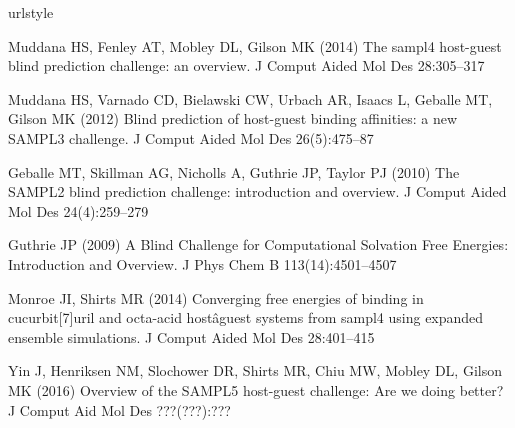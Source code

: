 
\begin{thebibliography}{25}
\providecommand{\natexlab}[1]{#1}
\providecommand{\url}[1]{{#1}}
\providecommand{\urlprefix}{URL }
\expandafter\ifx\csname urlstyle\endcsname\relax
  \providecommand{\doi}[1]{DOI~\discretionary{}{}{}#1}\else
  \providecommand{\doi}{DOI~\discretionary{}{}{}\begingroup
  \urlstyle{rm}\Url}\fi
\providecommand{\eprint}[2][]{\url{#2}}

Muddana HS, Fenley AT, Mobley DL, Gilson MK (2014) The sampl4 host-guest blind
  prediction challenge: an overview. J Comput Aided Mol Des 28:305--317

Muddana HS, Varnado CD, Bielawski CW, Urbach AR, Isaacs L, Geballe MT, Gilson
  MK (2012) {Blind prediction of host-guest binding affinities: a new SAMPL3
  challenge.} J Comput Aided Mol Des 26(5):475--87

Geballe MT, Skillman AG, Nicholls A, Guthrie JP, Taylor PJ (2010) The {SAMPL}2
  blind prediction challenge: introduction and overview. J Comput Aided Mol Des
  24(4):259--279

Guthrie JP (2009) A {Blind} {Challenge} for {Computational} {Solvation} {Free}
  {Energies}: {Introduction} and {Overview}. J Phys Chem B 113(14):4501--4507

Monroe JI, Shirts MR (2014) Converging free energies of binding in
  cucurbit[7]uril and octa-acid hostâguest systems from sampl4 using expanded
  ensemble simulations. J Comput Aided Mol Des 28:401--415

Yin J, Henriksen NM, Slochower DR, Shirts MR, Chiu MW, Mobley DL, Gilson MK
  (2016) Overview of the SAMPL5 host-guest challenge: Are we doing better? J
  Comput Aid Mol Des ???(???):???


\end{thebibliography}
